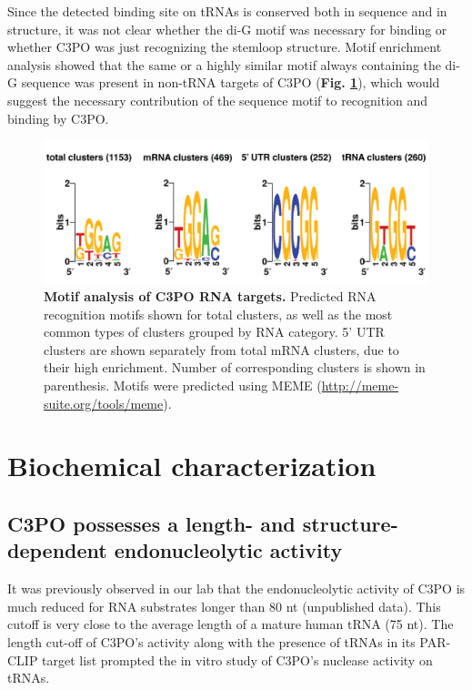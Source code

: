 \documentclass[12pt]{rockefeller}
\begin{document}
Since the detected binding site on tRNAs is conserved both in sequence and in structure, it was not clear whether the di-G motif was necessary for binding or whether C3PO was just recognizing the stemloop structure. Motif enrichment analysis showed that the same or a highly similar motif always containing the di-G sequence was present in non-tRNA targets of C3PO (\textbf{Fig. \ref{motifs}}), which would suggest the necessary contribution of the sequence motif to recognition and binding by C3PO.

\begin{figure}[!ht]%
\centering
\includegraphics[width=\textwidth]{motifs_collected.png} 
\caption[Motif analysis of C3PO RNA targets.]
{
\textbf{Motif analysis of C3PO RNA targets.}
Predicted RNA recognition motifs shown for total clusters, as well as the most common types of clusters grouped by RNA category. 5' UTR clusters are shown separately from total mRNA clusters, due to their high enrichment. Number of corresponding clusters is shown in parenthesis. Motifs were predicted using MEME (\url{http://meme-suite.org/tools/meme}).
}
\centering
\label{motifs}%
\end{figure}

\chapter{Biochemical characterization}

\section{C3PO possesses a length- and structure-dependent endonucleolytic activity}
It was previously observed in our lab that the endonucleolytic activity of C3PO is much reduced for RNA substrates longer than 80 nt (unpublished data). This cutoff is very close to the average length of a mature human tRNA (75 nt). The length cut-off of C3PO’s activity along with the presence of tRNAs in its PAR-CLIP target list prompted the in vitro study of C3PO’s nuclease activity on tRNAs. 
\end{document}
